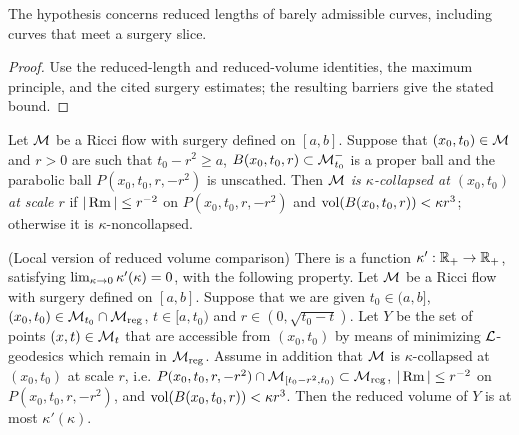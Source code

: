 \begin{remark}
\label{rem:kl-reduced-l-geometry-structural-remark-reduced-length}


The hypothesis concerns reduced lengths of barely admissible curves, including curves that meet a surgery slice.
\end{remark}

\begin{proof}
\sketch Use the reduced-length and reduced-volume identities, the maximum principle, and the cited surgery estimates; the resulting barriers give the stated bound.
\end{proof}

\begin{definition}
  \label{def:kl-reduced-l-geometry-kappa-noncollapsing}

\label{surgerycollapsedef}
Let ${\mathcal M}$ be a Ricci flow with surgery defined on $[a,b]$. Suppose that
$(x_0,t_0)\in{\mathcal M}$ and $r>0$ are such that $t_0-r^2\geq a$,
$B(x_0,t_0,r)\subset{\mathcal M}_{t_0}^-$ is a proper ball
and the parabolic ball $P(x_0,t_0,r,-r^2)$ is unscathed.
Then {\em ${\mathcal M}$ is $\kappa$-collapsed at $(x_0,t_0)$ at scale
$r$} if $|\operatorname{Rm}|\leq r^{-2}$ on $P(x_0,t_0,r,-r^2)$ and
$\operatorname{vol}(B(x_0,t_0,r))<\kappa r^3$; otherwise it is $\kappa$-noncollapsed.
\end{definition}

\begin{lemma}
  \label{lem:kl-reduced-l-geometry-existence-reduced-volume}
(Local version of reduced volume comparison)
\label{localreducedvolume}
There is a function $\kappa':{\mathbb R}_+\rightarrow {\mathbb R}_+$, satisfying
$\lim_{\kappa\rightarrow 0}\kappa'(\kappa)=0$, with the following property.
Let ${\mathcal M}$ be a Ricci flow with surgery defined on $[a,b]$. Suppose
that we are given $t_0\in (a,b]$,
$(x_0,t_0)\in {\mathcal M}_{t_0}\cap {\mathcal M}_{\operatorname{reg}}$, $t\in [a,t_0)$ and
$r \in (0,\sqrt{t_0-t})$.  Let $Y$ be the set of points $(x,t)\in {\mathcal M}_t$
that are accessible from $(x_0,t_0)$ by means of minimizing ${\mathcal L}$-geodesics
which remain in ${\mathcal M}_{\operatorname{reg}}$.  Assume
in addition that
${\mathcal M}$ is $\kappa$-collapsed at $(x_0,t_0)$ at scale $r$, i.e.
$P(x_0,t_0,r,-r^2) \cap {\mathcal M}_{[t_0 - r^2, t_0)} \subset{\mathcal M}_{\operatorname{reg}}$,
$|\operatorname{Rm}|\leq r^{-2}$ on
$P(x_0,t_0,r,-r^2)$, and $\operatorname{vol}(B(x_0,t_0,r))<\kappa r^3$.
Then  the reduced volume of $Y$ is at most
$\kappa'(\kappa)$.
\end{lemma}

